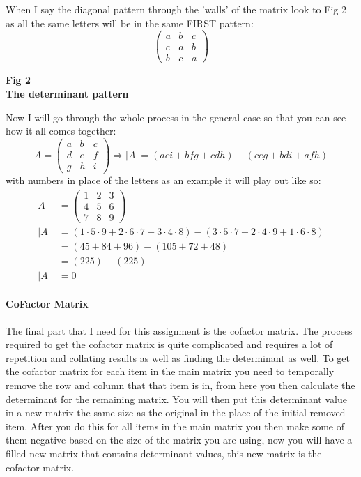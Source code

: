 \documentclass{article}
\begin{document}
When I say the diagonal pattern through the 'walls' of the matrix look to Fig 2 as all the same letters will be in the same FIRST pattern:
\[
	\begin{pmatrix}
		a & b & c\\
		c & a & b\\
		b & c & a
	\end{pmatrix}
\]
\begin{center}
	\small{ \textbf{Fig 2 \\ The determinant pattern}}
\end{center}

Now I will go through the whole process in the general case so that you can see how it all comes together:
\[
	A = 
	\begin{pmatrix}
		a & b & c\\
		d & e & f\\
		g & h & i
	\end{pmatrix}
	\Rightarrow
	|A| = (aei + bfg + cdh) - (ceg + bdi + afh)
\]
with numbers in place of the letters as an example it will play out like so:
\begin{align*}
	A &= 
	\begin{pmatrix}
		1 & 2 & 3\\
		4 & 5 & 6\\
		7 & 8 & 9
	\end{pmatrix}
	\\
	|A| &= (1\cdot5\cdot9+2\cdot6\cdot7+3\cdot4\cdot8) - (3\cdot5\cdot7+2\cdot4\cdot9+1\cdot6\cdot8)
	\\
	&= (45+84+96) - (105+72+48)
	\\
	&= (225) - (225)
	\\
	|A| &= 0
\end{align*}
\paragraph{CoFactor Matrix}
The final part that I need for this assignment is the cofactor matrix. The process required to get the cofactor matrix is quite complicated and requires a lot of repetition and collating results as well as finding the determinant as well. To get the cofactor matrix for each item in the main matrix you need to temporally remove the row and column that that item is in, from here you then calculate the determinant for the remaining matrix. You will then put this determinant value in a new matrix the same size as the original in the place of the initial removed item. After you do this for all items in the main matrix you then make some of them negative based on the size of the matrix you are using, now you will have a filled new matrix that contains determinant values, this new matrix is the cofactor matrix. 
\end{document}
